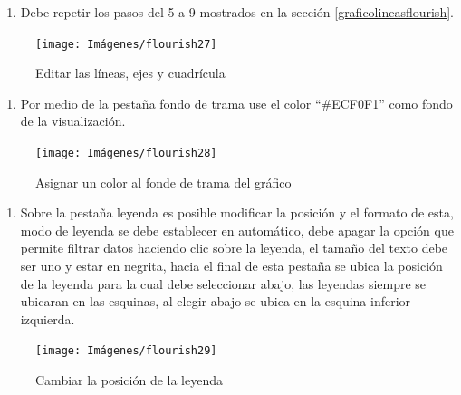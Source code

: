 \documentclass[
]{book}
\providecommand{\tightlist}{%
  \setlength{\itemsep}{0pt}\setlength{\parskip}{0pt}}
\begin{document}
\begin{enumerate}
\def\labelenumi{\arabic{enumi}.}
\setcounter{enumi}{3}
\tightlist
\item
  Debe repetir los pasos del 5 a 9 mostrados en la sección \ref{graficolineasflourish}.
\end{enumerate}

\begin{figure}

{\centering \texttt{[image: Imágenes/flourish27]} 

}

\caption{Editar las líneas, ejes y cuadrícula}\label{fig:formatodevisualizacionflourish-fig}
\end{figure}

\begin{enumerate}
\def\labelenumi{\arabic{enumi}.}
\setcounter{enumi}{4}
\tightlist
\item
  Por medio de la pestaña fondo de trama use el color ``\#ECF0F1'' como fondo de la visualización.
\end{enumerate}

\begin{figure}

{\centering \texttt{[image: Imágenes/flourish28]} 

}

\caption{Asignar un color al fonde de trama del gráfico}\label{fig:fondodetramamodalidadfromacionflourish-fig}
\end{figure}

\begin{enumerate}
\def\labelenumi{\arabic{enumi}.}
\setcounter{enumi}{5}
\tightlist
\item
  Sobre la pestaña leyenda es posible modificar la posición y el formato de esta, modo de leyenda se debe establecer en automático, debe apagar la opción que permite filtrar datos haciendo clic sobre la leyenda, el tamaño del texto debe ser uno y estar en negrita, hacia el final de esta pestaña se ubica la posición de la leyenda para la cual debe seleccionar abajo, las leyendas siempre se ubicaran en las esquinas, al elegir abajo se ubica en la esquina inferior izquierda.
\end{enumerate}

\begin{figure}

{\centering \texttt{[image: Imágenes/flourish29]} 

}

\caption{Cambiar la posición de la leyenda}\label{fig:cambiarposicionleyendaflourish-fig}
\end{figure}
\end{document}
